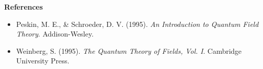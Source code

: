 \begin{technical}
    \vspace{0.5em}
    \noindent
    \textbf{References}
    \begin{itemize}
    \setlength\itemsep{0.25em}
    \item Peskin, M. E., \& Schroeder, D. V. (1995). \emph{An Introduction to Quantum Field Theory}. Addison-Wesley.
    \item Weinberg, S. (1995). \emph{The Quantum Theory of Fields, Vol. I}. Cambridge University Press.
    \end{itemize}
    
\end{technical}
    